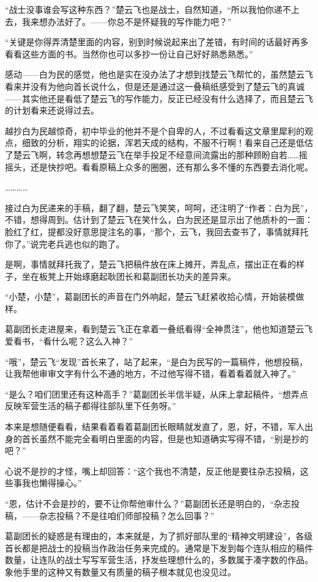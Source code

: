 “战士没事谁会写这种东西？”楚云飞也是战士，自然知道，“所以我怕你递不上去，我来想办法好了。——你总不是怀疑我的写作能力吧？”

“关键是你得弄清楚里面的内容，别到时候说起来出了差错，有时间的话最好再多看看这些方面的书。当然你也可以多抄一份让自己好好熟悉熟悉。”

感动——白为民的感觉，他也是实在没办法了才想到找楚云飞帮忙的，虽然楚云飞看来并没有为他向首长说什么，但是还是通过这一叠稿纸感受到了楚云飞的真诚——其实他还是看低了楚云飞的写作能力，反正已经没有什么选择了，而且楚云飞的计划看来还说得过去。

越抄白为民越惊奇，初中毕业的他并不是个自卑的人，不过看看这文章里犀利的观点，细致的分析，翔实的论据，浑若天成的结构，不服不行啊！看来自己还是低估了楚云飞啊，转念再想想楚云飞在举手投足不经意间流露出的那种顾盼自若……摇摇头，还是快抄吧。看看原稿上众多的圈圈，还有那么多不懂的东西要去消化呢。

…………

接过白为民递来的手稿，翻了翻，楚云飞笑笑，呵呵，还注明了“作者：白为民”，不错，想得周到。估计到了楚云飞在笑什么，白为民还是显示出了他质朴的一面：脸红了红，提都没好意思提注名的事，“那个，云飞，我回去查书了，事情就拜托你了。”说完老兵逃也似的跑了。

是啊，事情就拜托我了，楚云飞把稿件放在床上摊开，弄乱点，摆出正在看的样子，坐在板凳上开始琢磨起耿团长和葛副团长功夫的差异来。

“小楚，小楚”，葛副团长的声音在门外响起，楚云飞赶紧收拾心情，开始装模做样。

葛副团长走进屋来，看到楚云飞正在拿着一叠纸看得“全神贯注”，他也知道楚云飞爱看书，“看什么呢？这么入神？”

“哦”，楚云飞“发现”首长来了，站了起来，“是白为民写的一篇稿件，他想投稿，让我帮他审审文字有什么不通的地方，不过他写得不错，看着看着就入神了。”

“是么？咱们团里还有这种高手？”葛副团长半信半疑，从床上拿起稿件，“想弄点反映军营生活的稿子都得往部队里下任务呀。”

本来是想随便看看，结果看着看着葛副团长眼睛就发直了，恩，好，不错，军人出身的首长虽然不能完全看明白里面的内容，但是也知道确实写得不错，“别是抄的吧？”

心说不是抄的才怪，嘴上却回答：“这个我也不清楚，反正他是要往杂志投稿，这些事我也懒得操心。”

“恩，估计不会是抄的，要不让你帮他审什么？”葛副团长还是明白的，“杂志投稿，——杂志投稿？不是往咱们师部投稿？怎么回事？”

葛副团长的疑惑是有理由的，本来就是，为了抓好部队里的“精神文明建设”，各级首长都是把战士的投稿当作政治任务来完成的。通常是下发到每个连队相应的稿件数量，让连队的战士写写军营生活，抒发些理想什么的，多数属于凑字数的作品。象他手里的这种又有数量又有质量的稿子根本就见也没见过。

